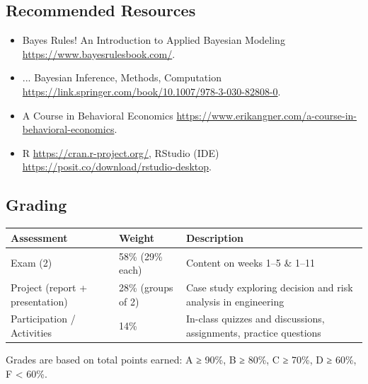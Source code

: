 \documentclass[10pt]{article}
\renewcommand{\arraystretch}{.9}
\begin{document}
\subsection*{Recommended Resources}
\begin{itemize}[leftmargin=*,nosep]
\item {Bayes Rules! An Introduction to Applied Bayesian Modeling} \url{https://www.bayesrulesbook.com/}.
\item {... Bayesian Inference, Methods, Computation} \mbox{\url{https://link.springer.com/book/10.1007/978-3-030-82808-0}}.
\item {A Course in Behavioral Economics} \mbox{\url{https://www.erikangner.com/a-course-in-behavioral-economics}.}
\item R \url{https://cran.r-project.org/}, RStudio (IDE) \url{https://posit.co/download/rstudio-desktop}.
\end{itemize}

\subsection*{Grading}
\renewcommand{\arraystretch}{1.025}
\begin{tabular}{l l l}
\hline
\textbf{Assessment}             & \textbf{Weight}    & \textbf{Description} \\
\hline
Exam (2)                        & 58\% (29\% each)   & Content on weeks 1--5 \& 1--11 \\ \hline
Project (report + presentation) & 28\% (groups of 2) & Case study exploring decision and risk analysis in engineering \\ \hline
Participation / Activities      & 14\%               & In-class quizzes and discussions, assignments, practice questions \\
\hline
\end{tabular}

\vspace{0pt}

{\footnotesize
\renewcommand{\arraystretch}{.9}
Grades are based on total points earned: A ≥ 90\%, B ≥ 80\%, C ≥ 70\%, D ≥ 60\%, F < 60\%.
}
\end{document}
